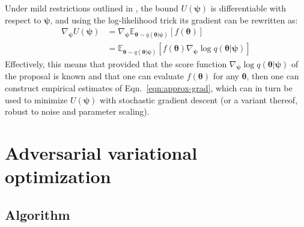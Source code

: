 \documentclass[twocolumn,superscriptaddress,aps]{revtex4-1}
\newcommand{\bftheta}{{\bm \theta}}
\newcommand{\bfpsi}{{\bm \psi}}
\theoremstyle{plain}
\begin{document}
Under mild restrictions outlined in  \citep{2012arXiv1212.4507S}, the bound
$U(\bfpsi)$ is differentiable with respect to $\bfpsi$, and using the log-likelihood
trick its gradient can be rewritten as:
\begin{align}\label{eqn:approx-grad}
    \nabla_\bfpsi U(\bfpsi) &= \nabla_\bfpsi \mathbb{E}_{\bftheta \sim q(\bftheta|\bfpsi)} [f(\bftheta)] \nonumber \\
    &= \mathbb{E}_{\bftheta \sim q(\bftheta|\bfpsi)} [f(\bftheta) \nabla_\bfpsi \log q(\bftheta|\bfpsi)]
\end{align}
Effectively, this means that provided that the score function $\nabla_\bfpsi \log
q(\bftheta|\bfpsi)$ of the proposal is known and that one can evaluate
$f(\mathbf{\bftheta})$ for any $\bftheta$, then one can construct empirical
estimates of Eqn.~\ref{eqn:approx-grad}, which can in turn be used to minimize
$U(\bfpsi)$ with stochastic gradient descent (or a variant thereof, robust to noise
and parameter scaling).



\section{Adversarial variational optimization}

\subsection{Algorithm}
\end{document}
